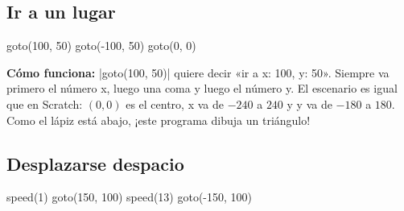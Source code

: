 \subsection*{Ir a un lugar}

\begin{tcbraster}[raster columns=2, raster equal height=rows, raster column skip=12pt, raster valign=center]
\begin{tcolorbox}[colback=white, colframe=white, boxrule=0pt, valign=center]
\begin{scratch}
\end{scratch}
\end{tcolorbox}
\begin{code}
goto(100, 50)
goto(-100, 50)
goto(0, 0)
\end{code}
\end{tcbraster}

\textbf{Cómo funciona:} \py|goto(100, 50)| quiere decir «ir a x: 100, y: 50». Siempre va primero el número x, luego una coma y luego el número y. El escenario es igual que en Scratch: $(0, 0)$ es el centro, x va de $-240$ a $240$ y y va de $-180$ a $180$. Como el lápiz está abajo, ¡este programa dibuja un triángulo!

\subsection*{Desplazarse despacio}

\begin{tcbraster}[raster columns=2, raster equal height=rows, raster column skip=12pt, raster valign=center]
\begin{tcolorbox}[colback=white, colframe=white, boxrule=0pt, valign=center]
\begin{scratch}[scale=0.89]
\end{scratch}
\end{tcolorbox}
\begin{code}
speed(1)
goto(150, 100)
speed(13)
goto(-150, 100)
\end{code}
\end{tcbraster}

